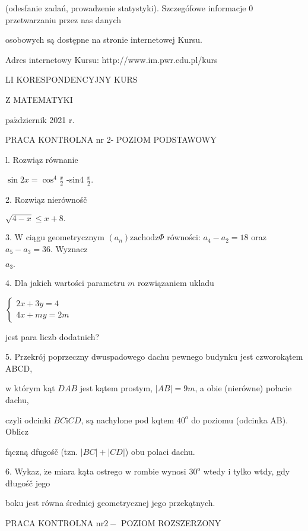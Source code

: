 \documentclass[a4paper,12pt]{article}
\begin{document}
(odesfanie zadań, prowadzenie statystyki). Szczegófowe informacje $0$ przetwarzaniu przez nas danych

osobowych są dostępne na stronie internetowej Kursu.

Adres internetowy Kursu: http://www.im.pwr.edu.pl/kurs







LI KORESPONDENCYJNY KURS

Z MATEMATYKI

$\mathrm{p}\mathrm{a}\acute{\mathrm{z}}$dziernik 2021 $\mathrm{r}.$

PRACA KONTROLNA nr 2- POZIOM PODSTAWOWY

l. Rozwiąz równanie

$\displaystyle \sin 2x=\cos^{4}\frac{x}{2}$ -sin4 $\displaystyle \frac{x}{2}.$

2. Rozwiąz nierównośč

$\sqrt{4-x}\leq x+8.$

3. $\mathrm{W}$ ciągu geometrycznym $(a_{n})\mathrm{z}\mathrm{a}\mathrm{c}\mathrm{h}\mathrm{o}\mathrm{d}\mathrm{z}\Phi$ równości: $a_{4}-a_{2}=18$ oraz $a_{5}-a_{3}=36$. Wyznacz

$a_{3}.$

4. Dla jakich wartości parametru $m$ rozwiązaniem ukladu

$\left\{\begin{array}{l}
2x+3y=4\\
4x+my=2m
\end{array}\right.$

jest para liczb dodatnich?

5. Przekrój poprzeczny dwuspadowego dachu pewnego budynku jest czworokątem ABCD,

$\mathrm{w}$ którym kąt $DAB$ jest kątem prostym, $|AB| =9m$, a obie (nierówne) połacie dachu,

czyli odcinki $BC\mathrm{i}CD$, są nachylone pod kqtem $40^{\mathrm{o}}$ do poziomu (odcinka AB). Oblicz

fączną dfugośč (tzn. $|BC|+|CD|$) obu polaci dachu.

6. Wykaz, $\dot{\mathrm{z}}\mathrm{e}$ miara kąta ostrego $\mathrm{w}$ rombie wynosi $30^{\mathrm{o}}$ wtedy $\mathrm{i}$ tylko wtdy, gdy długośč jego

boku jest równa średniej geometrycznej jego przekątnych.




PRACA KONTROLNA $\mathrm{n}\mathrm{r} 2-$ POZIOM ROZSZERZONY
\end{document}
